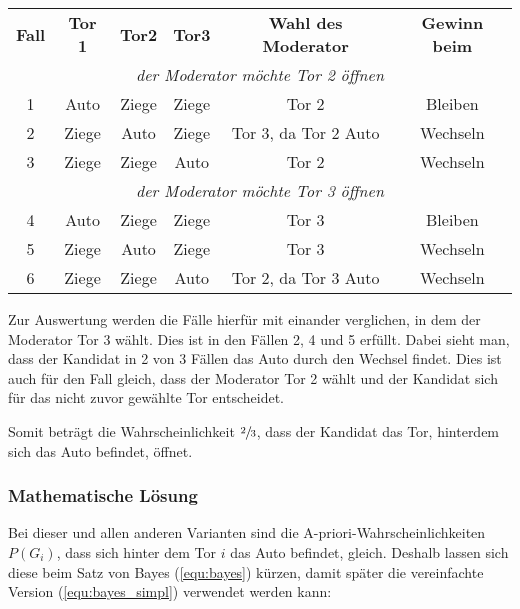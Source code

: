 \begin{tabular}[h]{cccccc}
    \textbf{Fall} & \textbf{Tor 1} & \textbf{Tor2} & \textbf{Tor3} & \textbf{Wahl des Moderator} & \textbf{Gewinn beim} \\
    \multicolumn{6}{c}{\textit{der Moderator möchte Tor 2 öffnen} }                                                     \\
    1             & Auto           & Ziege         & Ziege         & Tor 2                       & Bleiben              \\
    2             & Ziege          & Auto          & Ziege         & Tor 3, da Tor 2 Auto        & Wechseln             \\
    3             & Ziege          & Ziege         & Auto          & Tor 2                       & Wechseln             \\
    \multicolumn{6}{c}{\textit{der Moderator möchte Tor 3 öffnen} }                                                     \\
    4             & Auto           & Ziege         & Ziege         & Tor 3                       & Bleiben              \\
    5             & Ziege          & Auto          & Ziege         & Tor 3                       & Wechseln             \\
    6             & Ziege          & Ziege         & Auto          & Tor 2, da Tor 3 Auto        & Wechseln             \\
\end{tabular}

Zur Auswertung werden die Fälle hierfür mit einander verglichen, in dem der Moderator Tor 3 wählt. Dies ist in den Fällen 2, 4 und 5 erfüllt.
Dabei sieht man, dass der Kandidat in 2 von 3 Fällen das Auto durch den Wechsel findet. Dies ist auch für den Fall gleich, dass der Moderator Tor 2 wählt und
der Kandidat sich für das nicht zuvor gewählte Tor entscheidet.

Somit beträgt die Wahrscheinlichkeit $\sfrac{2}{3}$, dass der Kandidat das Tor, hinterdem sich das Auto befindet, öffnet.

\subsubsection{Mathematische Lösung}

Bei dieser und allen anderen Varianten sind die A-priori-Wahrscheinlichkeiten $P(G_i)$, dass sich hinter dem Tor $i$ das Auto befindet, gleich. Deshalb lassen sich diese beim Satz von Bayes (\autoref{equ:bayes}) kürzen, damit später die vereinfachte Version (\autoref{equ:bayes_simpl}) verwendet werden kann:

